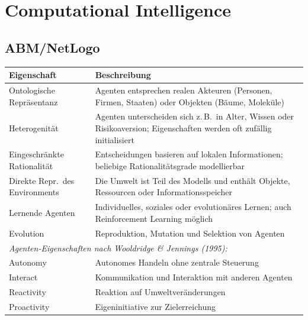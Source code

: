 \section{Computational Intelligence}

\subsection{ABM/NetLogo}



\begin{table}[H]
\centering
\begin{tabular}{p{5cm} p{10cm}}
\hline
\textbf{Eigenschaft} & \textbf{Beschreibung} \\
\hline
Ontologische Repräsentanz & Agenten entsprechen realen Akteuren (Personen, Firmen, Staaten) oder Objekten (Bäume, Moleküle) \\
Heterogenität & Agenten unterscheiden sich z.\,B.\ in Alter, Wissen oder Risikoaversion; Eigenschaften werden oft zufällig initialisiert \\
Eingeschränkte Rationalität & Entscheidungen basieren auf lokalen Informationen; beliebige Rationalitätsgrade modellierbar \\
Direkte Repr.\ des Environments & Die Umwelt ist Teil des Modells und enthält Objekte, Ressourcen oder Informationsspeicher \\
Lernende Agenten & Individuelles, soziales oder evolutionäres Lernen; auch Reinforcement Learning möglich \\
Evolution & Reproduktion, Mutation und Selektion von Agenten \\
\hline
\multicolumn{2}{l}{\textit{Agenten-Eigenschaften nach Wooldridge \& Jennings (1995):}} \\
Autonomy & Autonomes Handeln ohne zentrale Steuerung \\
Interact & Kommunikation und Interaktion mit anderen Agenten \\
Reactivity & Reaktion auf Umweltveränderungen \\
Proactivity & Eigeninitiative zur Zielerreichung \\
\hline
\end{tabular}
\end{table}

